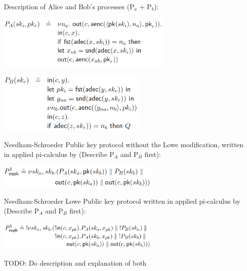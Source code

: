 Description of Alice and Bob's processes (P$_a$ + P$_b$):
\begin{center}
\includegraphics[width=0.65\textwidth, angle=0]{Graphics/P_A.pdf}
\end{center}
\begin{center}
\includegraphics[width=0.55\textwidth, angle=0]{Graphics/P_B.pdf}
\end{center}

Needham-Schroeder Public key protocol without the Lowe modification, written in applied pi-calculus by \citeauthor{DBLP:journals/ftpl/CortierK14} (Describe P$_{A}$ and P$_{B}$ first):
\begin{center}
\includegraphics[width=0.6\textwidth, angle=0]{Graphics/P1_nspk.pdf}
\end{center}
Needham-Schroeder Lowe Public key protocol written in applied pi-calculus by \citeauthor{DBLP:journals/ftpl/CortierK14} (Describe P$_{A}$ and P$_{B}$ first):
\begin{center}
\includegraphics[width=0.6\textwidth, angle=0]{Graphics/P5_nspk.pdf}
\end{center}
TODO: Do description and explanation of both 
